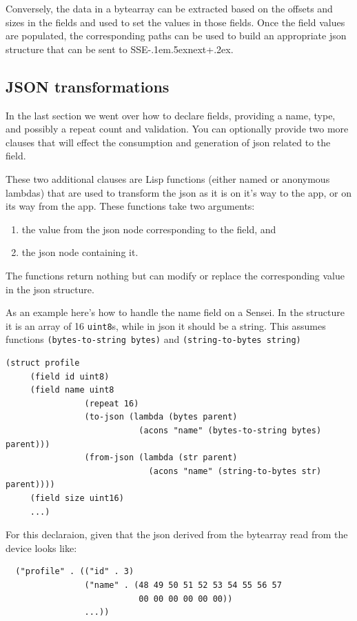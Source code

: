 \documentclass[12pt]{article}
\def\SSEnext{SSE\kern-.1em\lower.5ex\hbox{\footnotesize next}\kern+.2ex}
\def\SSEnext{SSE\kern-.1em\lower.5ex\hbox{\footnotesize next}\kern+.2ex}
\begin{document}
Conversely, the data in a bytearray can be extracted based on the
offsets and sizes in the fields and used to set the values in those
fields. Once the field values are populated, the corresponding paths
can be used to build an appropriate json structure that can be sent to
\SSEnext. 

\subsection{JSON transformations}

In the last section we went over how to declare fields, providing a
name, type, and possibly a repeat count and validation. You can
optionally provide two more clauses that will effect the consumption and
generation of json related to the field.

These two additional clauses are Lisp functions (either named or
anonymous lambdas) that are used to transform the json as it is on
it's way to the app, or on its way from the app. These functions take
two arguments:

\begin{enumerate} 
\item the value from the json node corresponding
to the field, and
\item the json node containing it. 
\end{enumerate}

The functions return nothing but can modify or replace the
corresponding value in the json structure.

As an example here's how to handle the name field on a Sensei. In the
structure it is an array of 16 \verb|uint8|s, while in json it should
be a string. This assumes functions \verb|(bytes-to-string bytes)| and
\verb|(string-to-bytes string)|

\begin{verbatim} 
(struct profile
     (field id uint8)
     (field name uint8 
                (repeat 16)
                (to-json (lambda (bytes parent)
                           (acons "name" (bytes-to-string bytes) parent)))
                (from-json (lambda (str parent)
                             (acons "name" (string-to-bytes str) parent))))
     (field size uint16)
     ...)
\end{verbatim}

\noindent For this declaraion, given that the json derived from the
bytearray read from the device looks like:

\begin{verbatim}
  ("profile" . (("id" . 3)
                ("name" . (48 49 50 51 52 53 54 55 56 57 
                           00 00 00 00 00 00))
                ...))
\end{verbatim}
\end{document}
